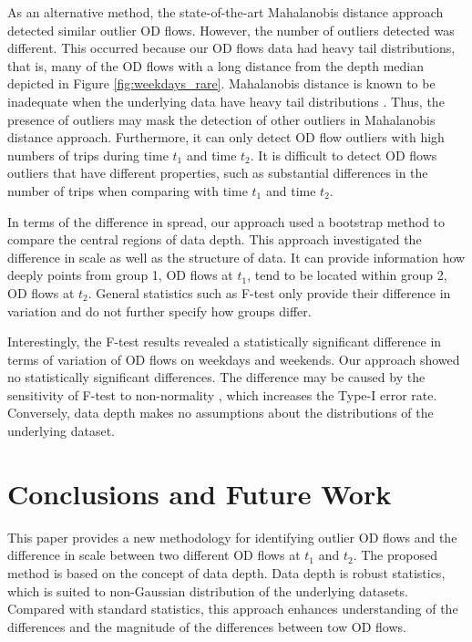 \documentclass[a4paper,UKenglish]{lipics-v2018}
\begin{document}
As an alternative method, the state-of-the-art Mahalanobis distance approach detected similar outlier OD flows.
However, the number of outliers detected was different.
This occurred because our OD flows data had heavy tail distributions, that is, many of the OD flows with a long distance from the depth median depicted in Figure \ref{fig:weekdays_rare}. Mahalanobis distance is known to be inadequate when the underlying data have heavy tail distributions \cite{wilcox12Book}. Thus, the presence of outliers may mask the detection of other outliers in Mahalanobis distance approach. Furthermore, it can only detect OD flow outliers with high numbers of trips during time $t_1$ and time $t_2$. It is difficult to detect OD flows outliers that have different properties, such as substantial differences in the number of trips when comparing with time $t_1$ and time $t_2$.

In terms of the difference in spread, our approach used a bootstrap method to compare the central regions of data depth.
This approach investigated the difference in scale as well as the structure of data.
It can provide information how deeply points from group 1, OD flows at $t_1$, tend to be located within group 2, OD flows at $t_2$.
General statistics such as F-test only provide their difference in variation and do not further specify how groups differ. 

Interestingly, the F-test results revealed a statistically significant difference in terms of variation of OD flows on weekdays and weekends.
Our approach showed no statistically significant differences.
The difference may be caused by the sensitivity of F-test to non-normality \cite{Field12book}, which increases the Type-I error rate.
Conversely, data depth makes no assumptions about the distributions of the underlying dataset.

%


\section{Conclusions and Future Work}
\label{sec:conclusions}

This paper provides a new methodology for identifying outlier OD flows and the difference in scale between two different OD flows at $t_1$ and $t_2$.
The proposed method is based on the concept of data depth.
Data depth is robust statistics, which is suited to non-Gaussian distribution of the underlying datasets.
Compared with standard statistics, this approach enhances understanding of the differences and the magnitude of the differences between tow OD flows. 
\end{document}
